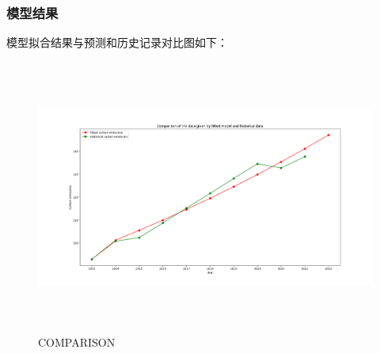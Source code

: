 \documentclass[a4paper, 12pt]{article}
\numberwithin{equation}{section}
\begin{document}
                \subsubsection{模型结果}
                    模型拟合结果与预测和历史记录对比图如下：
                    \begin{figure}[h]
                        \centering
                        \includegraphics[height=9cm,width=15cm]{fit_and_his_q4.png}
                        \caption{COMPARISON}
                    \end{figure}

    {}
\end{document}
